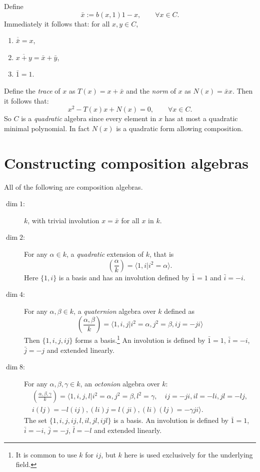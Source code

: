 \documentclass[12pt]{article}
\newcommand{\CayDick}[2]{\left(\frac{#1}{#2}\right)}
\begin{document}
Define
	\[\bar{x} := b(x,1)1 - x,\qquad \forall x\in C.\]
Immediately it follows that: for all $x,y\in C$,
\begin{enumerate}
\item $\overline{\bar{x}}=x$,
\item $\overline{x+y}=\bar{x}+\bar{y}$,
\item $\bar{1}=1$.
\end{enumerate}

Define the \emph{trace} of $x$ as $T(x)=x+\bar{x}$ and
the \emph{norm} of $x$ as $N(x)=\bar{x}x$.  Then it follows that:
	\[x^2-T(x)x+N(x)=0,\qquad \forall x\in C.\]
So $C$ is a \emph{quadratic} algebra since every element in $x$ has at most
a quadratic minimal polynomial.  In fact $N(x)$ is a quadratic form 
allowing composition.

\section{Constructing composition algebras}


All of the following are composition algebras.
\cite[III.4]{Schafer:nonass}
\begin{description}
\item[$\dim 1$:] $k$, with trivial involution $x=\bar{x}$ for all $x$ in $k$.
\item[$\dim 2$:] For any $\alpha\in k$, a \emph{quadratic} extension of $k$, that is
\[\CayDick{\alpha}{k}=\langle 1,i | i^2=\alpha\rangle.\]
Here $\{1,i\}$ is a basis and has an involution defined by $\bar{1}=1$ and $\bar{i}=-i$.
\item[$\dim 4$:] For any $\alpha,\beta\in k$, a \emph{quaternion} algebra over $k$ 
defined as
\[\CayDick{\alpha,\beta}{k}=\langle 1,i,j | i^2=\alpha, j^2=\beta, ij=-ji\rangle\]
Then $\{1,i,j,ij\}$ forms a basis.\footnote{It is common to use $k$ for $ij$, but $k$ here is used
exclusively for the underlying field.}  An involution is defined by $\bar{1}=1$, 
$\bar{i}=-i$, $\bar{j}=-j$ and extended linearly.
\item[$\dim 8$:] For any $\alpha,\beta,\gamma\in k$, an \emph{octonion} algebra over $k$:
\begin{multline*}
\CayDick{\alpha,\beta,\gamma}{k}=
\langle 1,i,j,l | i^2=\alpha, j^2=\beta, l^2=\gamma,\quad
	ij=-ji, il=-li, jl=-lj, \\
	i(lj)=-l(ij), (li)j=l(ji), (li)(lj)=-\gamma ji
	\rangle.
\end{multline*}
The set $\{1,i,j,ij,l,il,jl,ijl\}$ is a basis.
An involution is defined by $\bar{1}=1$, $\bar{i}=-i$, $\bar{j}=-j$, $\bar{l}=-l$
and extended linearly.
\end{description}
\end{document}
